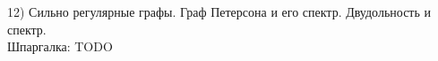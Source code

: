 12) Сильно регулярные графы. Граф Петерсона и его спектр. Двудольность и спектр.\\

Шпаргалка: TODO\\
